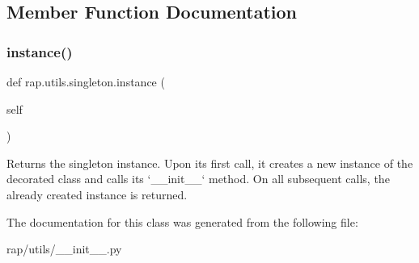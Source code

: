 \subsection{Member Function Documentation}
\mbox{\label{classrap_1_1utils_1_1singleton_a73cd49c901fb1b01c3afe3cefd773e00}} 
\subsubsection{\texorpdfstring{instance()}{instance()}}
{\footnotesize\ttfamily def rap.\+utils.\+singleton.\+instance (\begin{DoxyParamCaption}\item[{}]{self }\end{DoxyParamCaption})}

\begin{DoxyVerb}Returns the singleton instance. Upon its first call, it creates a
new instance of the decorated class and calls its `__init__` method.
On all subsequent calls, the already created instance is returned.\end{DoxyVerb}
 

The documentation for this class was generated from the following file\+:\begin{DoxyCompactItemize}
\item 
rap/utils/\+\_\+\+\_\+init\+\_\+\+\_\+.\+py\end{DoxyCompactItemize}
